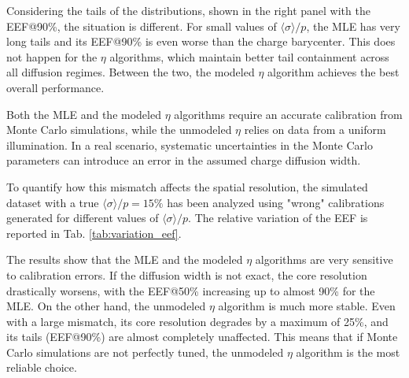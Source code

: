 Considering the tails of the distributions, shown in the right panel with the EEF@90\%, the situation is different. For small values of $\langle \sigma \rangle / p$, the MLE has very long tails and its EEF@90\% is even worse than the charge barycenter. This does not happen for the $\eta$ algorithms, which maintain better tail containment across all diffusion regimes. Between the two, the modeled $\eta$ algorithm achieves the best overall performance.


Both the MLE and the modeled $\eta$ algorithms require an accurate calibration from Monte Carlo simulations, while the unmodeled $\eta$ relies on data from a uniform illumination. In a real scenario, systematic uncertainties in the Monte Carlo parameters can introduce an error in the assumed charge diffusion width.

To quantify how this mismatch affects the spatial resolution, the simulated dataset with a true $\langle \sigma \rangle / p = 15\%$ has been analyzed using "wrong" calibrations generated for different values of $\langle \sigma \rangle / p$. The relative variation of the EEF is reported in Tab. \ref{tab:variation_eef}.

The results show that the MLE and the modeled $\eta$ algorithms are very sensitive to calibration errors. If the diffusion width is not exact, the core resolution drastically worsens, with the EEF@50\% increasing up to almost 90\% for the MLE. On the other hand, the unmodeled $\eta$ algorithm is much more stable. Even with a large mismatch, its core resolution degrades by a maximum of 25\%, and its tails (EEF@90\%) are almost completely unaffected. This means that if Monte Carlo simulations are not perfectly tuned, the unmodeled $\eta$ algorithm is the most reliable choice.

